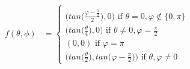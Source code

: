 
 \begin{align*}
     f(\theta,\phi) 
     &= 
     \begin{cases}
     \\  \bigg(tan\bigg(\frac{\varphi -  \frac{\pi}{2}}{2}\bigg),0\bigg) \text{ if $\theta = 0, \varphi \notin \{0,\pi\}$}
      \\  \bigg(tan\bigg(\frac{\theta}{4}\bigg),0\bigg) \text{ if $\theta \neq 0, \varphi = \frac{\pi}{2}$}
      \\ (0,0) \text{ if $\varphi = \pi$}
 \\ \Bigg(tan\bigg(\frac{\theta}{2}\bigg),tan\bigg(\varphi - \frac{\pi}{2}\bigg)\Bigg)  \text{ if $\theta, \varphi \neq 0$}
     \end{cases}
 \end{align*}
